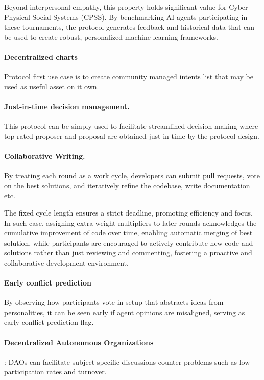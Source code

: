 \documentclass{article}
\begin{document}
\begin{CJK}{UTF8}{gbsn}
\begin{multicols}{2}
        Beyond interpersonal empathy, this property holds significant value for Cyber-Physical-Social Systems (CPSS)\cite{Fei2016}. By benchmarking AI agents participating in these tournaments, the protocol generates feedback and historical data that can be used to create robust, personalized machine learning frameworks.

        \paragraph{Decentralized charts} Protocol first use case is to create community managed intents list that may be used as useful asset on it own.

        \paragraph{Just-in-time decision management.} This protocol can be simply used to facilitate streamlined decision making where top rated proposer and proposal are obtained just-in-time by the protocol design.
        \paragraph*{Collaborative Writing.} By treating each round as a work cycle, developers can submit pull requests, vote on the best solutions, and iteratively refine the codebase, write documentation etc.

        The fixed cycle length ensures a strict deadline, promoting efficiency and focus. In such case, assigning extra weight multipliers to later rounds acknowledges the cumulative improvement of code over time, enabling automatic merging of best solution, while participants are encouraged to actively contribute new code and solutions rather than just reviewing and commenting, fostering a proactive and collaborative development environment.
        \paragraph{Early conflict prediction} By observing how participants vote in setup that abstracts ideas from personalities, it can be seen early if agent opinions are misaligned, serving as early conflict prediction flag.
        \paragraph*{Decentralized Autonomous Organizations}: DAOs can facilitate subject specific discussions counter problems such as low participation rates and turnover.\cite{Rainer2023}\cite{Marcella2016}\cite{Xuan2024}

\end{multicols}
\end{CJK}
\end{document}
